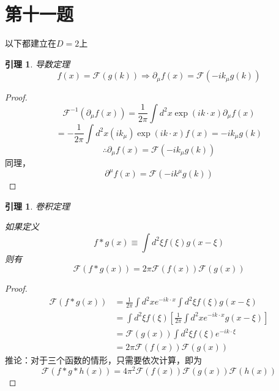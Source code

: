 \documentclass[a4paper]{ctexart}
\newtheorem{yinli}[subsection]{引理}
\begin{document}
\section{第十一题}
以下都建立在$D=2$上
\begin{yinli}{导数定理}\label{11dao}
    $$
        f\left( x \right) =\mathcal{F}\left( g\left( k \right) \right) \Rightarrow \partial _{\mu}f\left( x \right) =\mathcal{F}\left( -ik_{\mu}g\left( k \right) \right)
    $$
\end{yinli}
\begin{proof}
    $$
        \mathcal{F}^{-1}\left( \partial _{\mu}f\left( x \right) \right) =\frac{1}{2\pi}\int{d^2x\exp \left( ik\cdot x \right)}\partial _{\mu}f\left( x \right)
    $$
    $$
        =-\frac{1}{2\pi}\int{d^2x\left( ik_{\mu} \right) \exp \left( ik\cdot x \right)}f\left( x \right) =-ik_{\mu}g\left( k \right)
    $$
    $$
        \therefore \partial _{\mu}f\left( x \right) =\mathcal{F}\left( -ik_{\mu}g\left( k \right) \right)
    $$
    同理，
    $$
        \partial ^{\mu}f\left( x \right) =\mathcal{F}\left( -ik^{\mu}g\left( k \right) \right)
    $$

\end{proof}
\begin{yinli}{卷积定理}\label{11juan}

    如果定义
    $$
        f*g\left( x \right) \equiv \int{d^2\xi f\left( \xi \right)}g\left( x-\xi \right)
    $$
    则有
    $$
        \mathcal{F}\left( f*g\left( x \right) \right) =2\pi \mathcal{F}\left( f\left( x \right) \right) \mathcal{F}\left( g\left( x \right) \right)
    $$
\end{yinli}
\begin{proof}
    $$
        \begin{aligned}
            \mathcal{F}\left( f*g\left( x \right) \right)
             & =\frac{1}{2\pi}\int{d^2xe^{-ik\cdot x}}\int{d^2\xi f\left( \xi \right)}g\left( x-\xi \right)                \\
             & =\int{d^2\xi}f\left( \xi \right) \left[ \frac{1}{2\pi}\int{d^2x}e^{-ik\cdot x}g\left( x-\xi \right) \right] \\
             & =\mathcal{F}\left( g\left( x \right) \right) \int{d^2\xi}f\left( \xi \right) e^{-ik\cdot \xi}               \\
             & =2\pi \mathcal{F}\left( f\left( x \right) \right) \mathcal{F}\left( g\left( x \right) \right)
        \end{aligned}
    $$
推论：对于三个函数的情形，只需要依次计算，即为
$$
\mathcal{F}\left( f*g*h\left( x \right) \right) =4\pi ^2\mathcal{F}\left( f\left( x \right) \right) \mathcal{F}\left( g\left( x \right) \right) \mathcal{F}\left( h\left( x \right) \right) 
$$


\end{proof}
\end{document}
